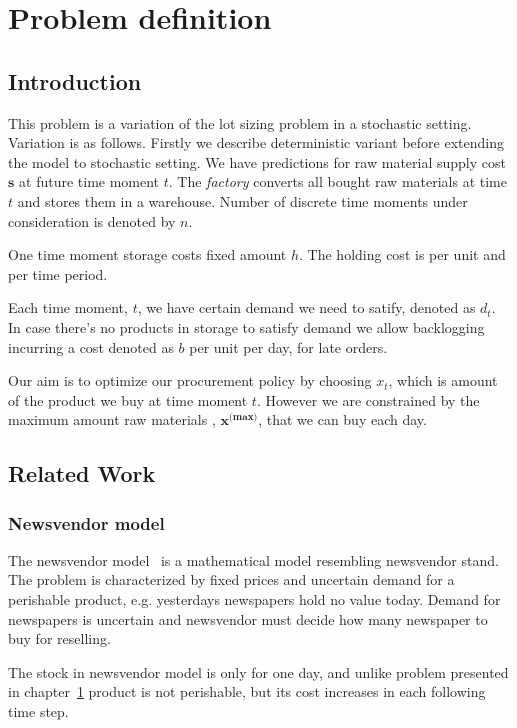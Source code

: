 
\chapter{Problem definition}
\label{chap:prob-def}
\section{Introduction}

This problem is a variation of the lot sizing problem in a stochastic setting. Variation is as follows. Firstly we describe deterministic variant before extending the model to stochastic setting. We have predictions for raw material supply cost $\mathbf{s}$ at future time moment $t$. The \emph{factory} converts all bought raw materials at time $t$ and stores them in a warehouse. Number of discrete time moments under consideration is denoted by $n$.

One time moment storage costs fixed amount $h$. The  holding cost is per unit and per time period.

Each time moment, $t$, we have certain demand we need to satify, denoted as $d_t$. In case there's no products in storage to satisfy demand we allow backlogging incurring a cost denoted as $b$ per unit per day, for late orders.

Our aim is to optimize our procurement policy by choosing $x_t$, which is amount of the product we buy at time moment $t$. However we are constrained by the maximum amount raw materials , $\mathbf{x^{\text{(max)}}}$, that we can buy each day.

\section{Related Work}

\subsection{Newsvendor model}
\label{sec:Newsvendor model}

The newsvendor model~\cite{Arrow1974} is a mathematical model resembling newsvendor stand. The problem is characterized by fixed prices and uncertain demand for a perishable product, e.g. yesterdays newspapers hold no value today. Demand for newspapers is uncertain and newsvendor must decide how many newspaper to buy for reselling.


The stock in newsvendor model is only for one day, and unlike problem presented in chapter~\ref{chap:prob-def} product is not perishable, but its cost increases in each following time step.

